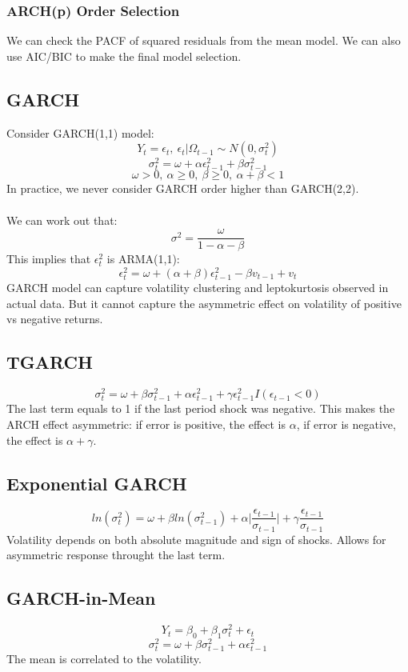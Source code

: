 \documentclass{article}
\begin{document}
\subsubsection{ARCH(p) Order Selection}
We can check the PACF of squared residuals from the mean model. We can also use AIC/BIC to make the final model selection.

\subsection{GARCH}
Consider GARCH(1,1) model:
$$Y_t = \epsilon_t, \ \epsilon_t|\Omega_{t-1} \sim N(0, \sigma_t^2)$$
$$\sigma_t^2 = \omega + \alpha \epsilon_{t-1}^2 + \beta \sigma_{t-1}^2$$
$$\omega > 0,\ \alpha \geq 0,\ \beta \geq 0,\ \alpha + \beta < 1$$
In practice, we never consider GARCH order higher than GARCH(2,2).\\
\\
We can work out that:
$$\sigma^2 = \frac{\omega}{1-\alpha - \beta}$$
This implies that $\epsilon_t^2$ is ARMA(1,1):
$$\epsilon_t^2 = \omega + (\alpha + \beta)\epsilon_{t-1}^2 - \beta v_{t-1} + v_t$$
GARCH model can capture volatility clustering and leptokurtosis observed in actual data. But it cannot capture the asymmetric effect on volatility of positive vs negative returns.

\subsection{TGARCH}
$$\sigma_t^2 = \omega + \beta \sigma_{t-1}^2 + \alpha \epsilon_{t-1}^2 + \gamma\epsilon_{t-1}^2I(\epsilon_{t-1} < 0)$$
The last term equals to 1 if the last period shock was negative. This makes the ARCH effect asymmetric: if error is positive, the effect is $\alpha$, if error is negative, the effect is $\alpha + \gamma$.

\subsection{Exponential GARCH}
$$ln(\sigma_t^2) = \omega + \beta ln(\sigma_{t-1}^2) + \alpha \big | \frac{\epsilon_{t-1}}{\sigma_{t-1}} \big | + \gamma \frac{\epsilon_{t-1}}{\sigma_{t-1}}$$
Volatility depends on both absolute magnitude and sign of shocks. Allows for asymmetric response throught the last term.

\subsection{GARCH-in-Mean}
$$Y_t = \beta_0 + \beta_1 \sigma_t^2 + \epsilon_t$$
$$\sigma_t^2 = \omega + \beta \sigma_{t-1}^2 + \alpha \epsilon_{t-1}^2$$
The mean is correlated to the volatility.
\end{document}
